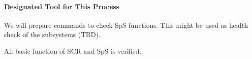 
\paragraph{Designated Tool for This Process}
We will prepare commands to check SpS functions.
This might be used as health check of the subsystems (TBD).


\begin{itembox}[l]{}
All basic function of SCR and SpS is verified.
\end{itembox}